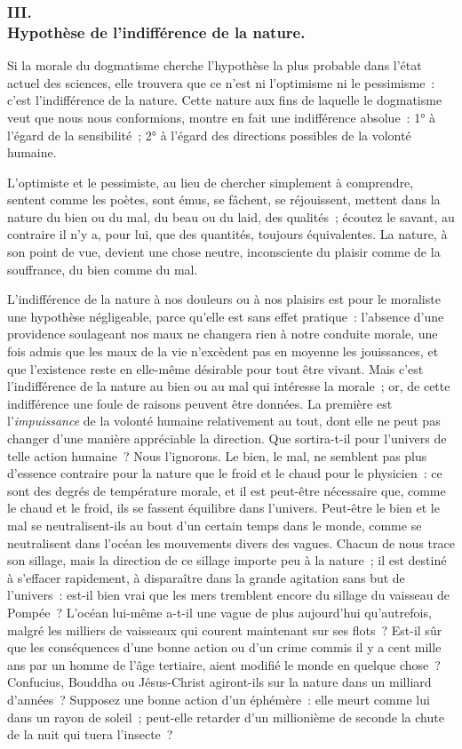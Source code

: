 \documentclass[french,twoside]{book} %
\begin{document}
\subsubsection[{III. Hypothèse de l’indifférence de la nature.}]{III. \\
Hypothèse de l’indifférence de la nature.}
\noindent Si la morale du dogmatisme cherche l’hypothèse la plus probable dans l’état actuel des sciences, elle trouvera que ce n’est ni l’optimisme ni le pessimisme : c’est l’indifférence de la nature. Cette nature aux fins de laquelle le dogmatisme veut que nous nous conformions, montre en fait une indifférence absolue : 1° à l’égard de la sensibilité ; 2° à l’égard des directions possibles de la volonté humaine.\par
L’optimiste et le pessimiste, au lieu de chercher simplement à comprendre, sentent comme les poètes, sont émus, se fâchent, se réjouissent, mettent dans la nature du bien ou du mal, du beau ou du laid, des qualités ; écoutez le savant, au contraire il n’y a, pour lui, que des quantités, toujours équivalentes. La nature, à son point de vue, devient une chose neutre, inconsciente du plaisir comme de la souffrance, du bien comme du mal.\par
L’indifférence de la nature à nos douleurs ou à nos plaisirs est pour le moraliste une hypothèse négligeable, parce qu’elle est sans effet pratique : l’absence d’une providence soulageant nos maux ne changera rien à notre conduite morale, une fois admis que les maux de la vie n’excèdent pas en moyenne les jouissances, et que l’existence reste en elle-même désirable pour tout être vivant. Mais c’est l’indifférence de la nature au bien ou au mal qui intéresse la morale ; or, de cette indifférence une foule de raisons peuvent être données. La première est l’\emph{impuissance} de la volonté humaine relativement au tout, dont elle ne peut pas changer d’une manière appréciable la direction. Que sortira-t-il pour l’univers de telle action humaine ? Nous l’ignorons. Le bien, le mal, ne semblent pas plus d’essence contraire pour la nature que le froid et le chaud pour le physicien : ce sont des degrés de température morale, et il est peut-être nécessaire que, comme le chaud et le froid, ils se fassent équilibre dans l’univers. Peut-être le bien et le mal se neutralisent-ils au bout d’un certain temps dans le monde, comme se neutralisent dans l’océan les mouvements divers des vagues. Chacun de nous trace son sillage, mais la direction de ce sillage importe peu à la nature ; il est destiné à s’effacer rapidement, à disparaître dans la grande agitation sans but de l’univers : est-il bien vrai que les mers tremblent encore du sillage du vaisseau de Pompée ? L’océan lui-même a-t-il une vague de plus aujourd’hui qu’autrefois, malgré les milliers de vaisseaux qui courent maintenant sur ses flots ? Est-il sûr que les conséquences d’une bonne action ou d’un crime commis il y a cent mille ans par un homme de l’âge tertiaire, aient modifié le monde en quelque chose ? Confucius, Bouddha ou Jésus-Christ agiront-ils sur la nature dans un milliard d’années ? Supposez une bonne action d’un éphémère : elle meurt comme lui dans un rayon de soleil ; peut-elle retarder d’un millionième de seconde la chute de la nuit qui tuera l’insecte ?\par
\end{document}

